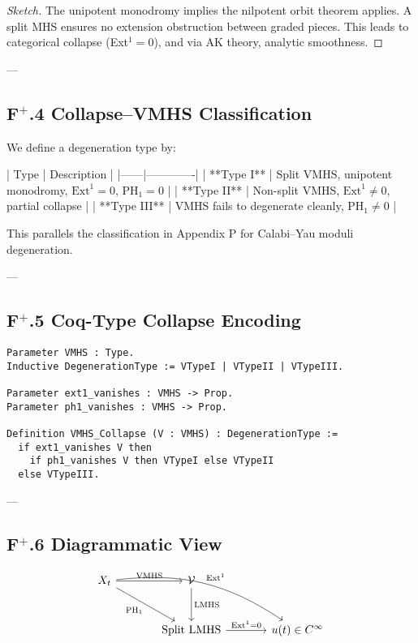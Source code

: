 \documentclass[11pt]{article}
\begin{document}
\begin{proof}[Sketch]
The unipotent monodromy implies the nilpotent orbit theorem applies.  
A split MHS ensures no extension obstruction between graded pieces.  
This leads to categorical collapse (Ext$^1 = 0$), and via AK theory, analytic smoothness.
\end{proof}

---

\subsection*{F$^+$.4 Collapse–VMHS Classification}

We define a degeneration type by:

| Type | Description |
|------|-------------|
| **Type I** | Split VMHS, unipotent monodromy, \( \mathrm{Ext}^1 = 0 \), \( \mathrm{PH}_1 = 0 \) |
| **Type II** | Non-split VMHS, \( \mathrm{Ext}^1 \neq 0 \), partial collapse |
| **Type III** | VMHS fails to degenerate cleanly, \( \mathrm{PH}_1 \neq 0 \) |

This parallels the classification in Appendix P for Calabi–Yau moduli degeneration.

---

\subsection*{F$^+$.5 Coq-Type Collapse Encoding}

\begin{lstlisting}[language=Coq]
Parameter VMHS : Type.
Inductive DegenerationType := VTypeI | VTypeII | VTypeIII.

Parameter ext1_vanishes : VMHS -> Prop.
Parameter ph1_vanishes : VMHS -> Prop.

Definition VMHS_Collapse (V : VMHS) : DegenerationType :=
  if ext1_vanishes V then
    if ph1_vanishes V then VTypeI else VTypeII
  else VTypeIII.
\end{lstlisting}

---

\subsection*{F$^+$.6 Diagrammatic View}

\[
\begin{tikzcd}[row sep=large, column sep=large]
X_t \arrow[r, "\text{VMHS}"] \arrow[dr, "\mathrm{PH}_1"'] \arrow[drr, bend left=20, "\mathrm{Ext}^1"] &
\mathcal{V} \arrow[d, "\text{LMHS}"] \\
& \text{Split LMHS} \arrow[r, "\mathrm{Ext}^1 = 0"] &
u(t) \in C^\infty
\end{tikzcd}
\]
\end{document}
